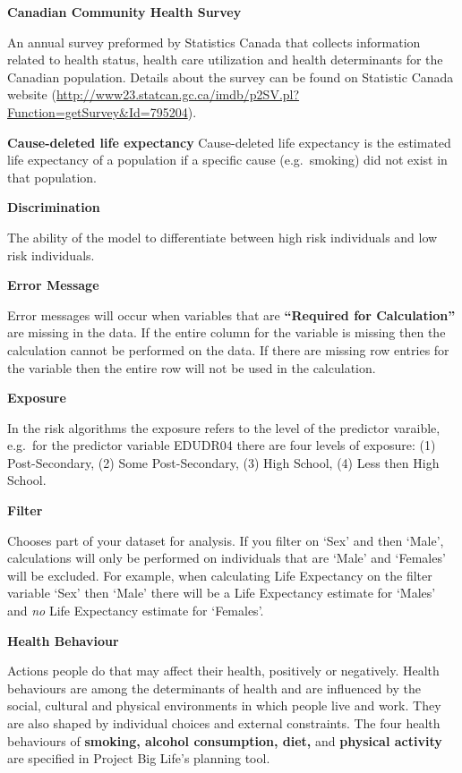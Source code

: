 \documentclass[]{book}
\begin{document}
\textbf{Canadian Community Health Survey}

An annual survey preformed by Statistics Canada that collects
information related to health status, health care utilization and health
determinants for the Canadian population. Details about the survey can
be found on Statistic Canada website
(\url{http://www23.statcan.gc.ca/imdb/p2SV.pl?Function=getSurvey\&Id=795204}).

\textbf{Cause-deleted life expectancy} Cause-deleted life expectancy is the estimated life
expectancy of a population if a specific cause (e.g.~smoking) did not
exist in that population.

\textbf{Discrimination}

The ability of the model to differentiate between high risk individuals
and low risk individuals.

\textbf{Error Message}

Error messages will occur when variables that are \textbf{``Required for
Calculation''} are missing in the data. If the entire column for the
variable is missing then the calculation cannot be performed on the
data. If there are missing row entries for the variable then the entire
row will not be used in the calculation.

\textbf{Exposure}

In the risk algorithms the exposure refers to the level of the predictor
varaible, e.g.~for the predictor variable EDUDR04 there are four levels
of exposure: (1) Post-Secondary, (2) Some Post-Secondary, (3) High
School, (4) Less then High School.

\textbf{Filter}

Chooses part of your dataset for analysis. If you filter on
`Sex' and then `Male', calculations will only be performed on
individuals that are `Male' and `Females' will be excluded. For example,
when calculating Life Expectancy on the filter variable `Sex' then
`Male' there will be a Life Expectancy estimate for `Males' and
\emph{no} Life Expectancy estimate for `Females'.

\textbf{Health Behaviour}

Actions people do that may affect their health, positively or
negatively. Health behaviours are among the determinants of health and
are influenced by the social, cultural and physical environments in
which people live and work.\citep{StatsCan2010} They are also shaped by
individual choices and external constraints.\citep{StatsCan2010} The
four health behaviours of \textbf{smoking, alcohol consumption, diet,}
and \textbf{physical activity} are specified in Project Big Life's
planning tool.
\end{document}
